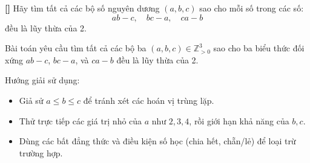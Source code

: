 \documentclass[../06-largest-exponent.tex]{subfiles}
\begin{document}
\begin{example*}\label{example:IMO-2015-P2}\textbf{[]}
	Hãy tìm tất cả các bộ số nguyên dương \( (a, b, c) \) sao cho mỗi số trong các số:
	\[
		ab - c,\quad bc - a,\quad ca - b
	\]
	đều là lũy thừa của 2.
\end{example*}

\begin{story*}
    Bài toán yêu cầu tìm tất cả các bộ ba \( (a, b, c) \in \mathbb{Z}_{>0}^3 \) sao cho ba biểu thức đối xứng \( ab - c \), \( bc - a \), và \( ca - b \) đều là lũy thừa của 2.

    Hướng giải sử dụng:
    \begin{itemize}[topsep=0pt, partopsep=0pt, itemsep=0pt]
        \item Giả sử \( a \le b \le c \) để tránh xét các hoán vị trùng lặp.
        \item Thử trực tiếp các giá trị nhỏ của \( a \) như \( 2, 3, 4 \), rồi giới hạn khả năng của \( b, c \).
        \item Dùng các bất đẳng thức và điều kiện số học (chia hết, chẵn/lẻ) để loại trừ trường hợp.
    \end{itemize}
\end{story*}

\bigbreak
\end{document}
